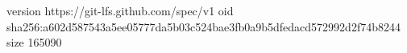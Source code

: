 version https://git-lfs.github.com/spec/v1
oid sha256:a602d587543a5ee05777da5b03c524bae3fb0a9b5dfedacd572992d2f74b8244
size 165090
